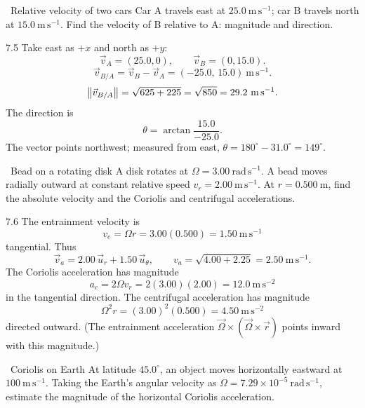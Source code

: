 \begin{exercise}{\core\ Relative velocity of two cars}
Car A travels east at $25.0\ \mathrm{m\,s^{-1}}$; car B travels north at
$15.0\ \mathrm{m\,s^{-1}}$. Find the velocity of B relative to A: magnitude and
direction.
\end{exercise}

\begin{tabletworkspace}[6.5cm]
\end{tabletworkspace}

\begin{solution}{7.5}
Take east as $+x$ and north as $+y$:
\[
\vec v_A=(25.0,0),\qquad \vec v_B=(0,15.0).
\]
\[
\vec v_{B/A}=\vec v_B-\vec v_A=(-25.0,\,15.0)\ \mathrm{m\,s^{-1}}.
\]
\[
\left\lVert \vec v_{B/A} \right\rVert=\sqrt{625+225}=\sqrt{850}=29.2\ \mathrm{m\,s^{-1}}.
\]
The direction is
\[
\theta=\arctan\frac{15.0}{-25.0}.
\]
The vector points northwest; measured from east,
$\theta=180^\circ-31.0^\circ=149^\circ$.
\end{solution}

\begin{exercise}{\core\ Bead on a rotating disk}
A disk rotates at $\Omega=3.00\ \mathrm{rad\,s^{-1}}$. A bead moves radially
outward at constant relative speed $v_r=2.00\ \mathrm{m\,s^{-1}}$. At
$r=0.500\ \mathrm{m}$, find the absolute velocity and the Coriolis and
centrifugal accelerations.
\end{exercise}

\begin{tabletworkspace}[6.5cm]
\end{tabletworkspace}

\begin{solution}{7.6}
The entrainment velocity is
\[
v_e=\Omega r=3.00(0.500)=1.50\ \mathrm{m\,s^{-1}}
\]
tangential. Thus
\[
\vec v_a=2.00\,\vec u_r+1.50\,\vec u_\theta,
\qquad
v_a=\sqrt{4.00+2.25}=2.50\ \mathrm{m\,s^{-1}}.
\]
The Coriolis acceleration has magnitude
\[
a_c=2\Omega v_r=2(3.00)(2.00)=12.0\ \mathrm{m\,s^{-2}}
\]
in the tangential direction. The centrifugal acceleration has magnitude
\[
\Omega^2r=(3.00)^2(0.500)=4.50\ \mathrm{m\,s^{-2}}
\]
directed outward. (The entrainment acceleration
$\vec\Omega\times(\vec\Omega\times\vec r)$ points inward with this magnitude.)
\end{solution}

\begin{exercise}{\core\ Coriolis on Earth}
At latitude $45.0^\circ$, an object moves horizontally eastward at
$100\ \mathrm{m\,s^{-1}}$. Taking the Earth's angular velocity as
$\Omega=7.29\times10^{-5}\ \mathrm{rad\,s^{-1}}$, estimate the magnitude of the
horizontal Coriolis acceleration.
\end{exercise}

